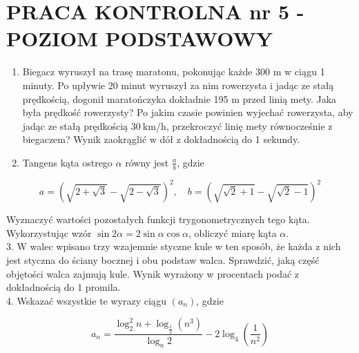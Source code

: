 \documentclass[10pt]{article}
\begin{document}
\section*{PRACA KONTROLNA nr 5 - POZIOM PODSTAWOWY}
\begin{enumerate}
  \item Biegacz wyruszył na trasę maratonu, pokonując każde 300 m w ciągu 1 minuty. Po upływie 20 minut wyruszył za nim rowerzysta i jadąc ze stałą prędkością, dogonił maratończyka dokładnie 195 m przed linią mety. Jaka była prędkość rowerzysty? Po jakim czasie powinien wyjechać rowerzysta, aby jadąc ze stałą prędkością $30 \mathrm{~km} / \mathrm{h}$, przekroczyć linię mety równocześnie z biegaczem? Wynik zaokrąglić w dół z dokładnością do 1 sekundy.
  \item Tangens kąta ostrego $\alpha$ równy jest $\frac{a}{b}$, gdzie
\end{enumerate}

$$
a=(\sqrt{2+\sqrt{3}}-\sqrt{2-\sqrt{3}})^{2}, \quad b=(\sqrt{\sqrt{2}+1}-\sqrt{\sqrt{2}-1})^{2}
$$

Wyznaczyć wartości pozostałych funkcji trygonometrycznych tego kąta. Wykorzystując wzór $\sin 2 \alpha=2 \sin \alpha \cos \alpha$, obliczyć miarę kąta $\alpha$.\\
3. W walec wpisano trzy wzajemnie styczne kule w ten sposób, że każda z nich jest styczna do ściany bocznej i obu podstaw walca. Sprawdzić, jaką część objętości walca zajmują kule. Wynik wyrażony w procentach podać z dokładnością do 1 promila.\\
4. Wskazać wszystkie te wyrazy ciągu $\left(a_{n}\right)$, gdzie

$$
a_{n}=\frac{\log _{2}^{2} n+\log _{\frac{1}{2}}\left(n^{3}\right)}{\log _{n} 2}-2 \log _{4}\left(\frac{1}{n^{2}}\right)
$$
\end{document}
